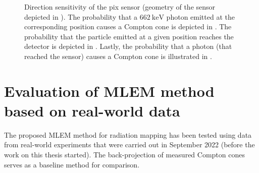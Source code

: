 \begin{figure}[!htb]
  \caption{Direction sensitivity of the \ac{pix} sensor (geometry of the sensor depicted in \protect{}). 
  The probability that a $\SI{662}{\kilo\electronvolt}$ photon emitted at the corresponding position causes a Compton cone is depicted in \protect{}. 
  The probability that the particle emitted at a given position reaches the detector is depicted in \protect{}. 
  Lastly, the probability that a photon (that reached the sensor) causes a Compton cone is illustrated in \protect{}.}
  \label{fig:monte_clar}
\end{figure}%
\newpage
\section{Evaluation of MLEM method based on real-world data\label{chap:exp1}}
The proposed \ac{MLEM} method for radiation mapping has been tested using data from real-world experiments that were carried out in September 2022 (before the work on this thesis started).
The back-projection of measured Compton cones serves as a baseline method for comparison.
